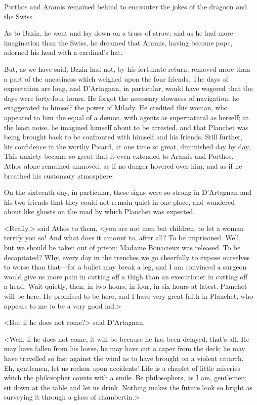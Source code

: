 Porthos and Aramis remained behind to encounter the jokes of the dragoon and the Swiss. 

As to Bazin, he went and lay down on a truss of straw; and as he had more imagination than the Swiss, he dreamed that Aramis, having become pope, adorned his head with a cardinal's hat. 

But, as we have said, Bazin had not, by his fortunate return, removed more than a part of the uneasiness which weighed upon the four friends. The days of expectation are long, and D'Artagnan, in particular, would have wagered that the days were forty-four hours. He forgot the necessary slowness of navigation; he exaggerated to himself the power of Milady. He credited this woman, who appeared to him the equal of a demon, with agents as supernatural as herself; at the least noise, he imagined himself about to be arrested, and that Planchet was being brought back to be confronted with himself and his friends. Still further, his confidence in the worthy Picard, at one time so great, diminished day by day. This anxiety became so great that it even extended to Aramis and Porthos. Athos alone remained unmoved, as if no danger hovered over him, and as if he breathed his customary atmosphere. 

On the sixteenth day, in particular, these signs were so strong in D'Artagnan and his two friends that they could not remain quiet in one place, and wandered about like ghosts on the road by which Planchet was expected. 

<Really,> said Athos to them, <you are not men but children, to let a woman terrify you so! And what does it amount to, after all? To be imprisoned. Well, but we should be taken out of prison; Madame Bonacieux was released. To be decapitated? Why, every day in the trenches we go cheerfully to expose ourselves to worse than that—for a bullet may break a leg, and I am convinced a surgeon would give us more pain in cutting off a thigh than an executioner in cutting off a head. Wait quietly, then; in two hours, in four, in six hours at latest, Planchet will be here. He promised to be here, and I have very great faith in Planchet, who appears to me to be a very good lad.> 

<But if he does not come?> said D'Artagnan. 

<Well, if he does not come, it will be because he has been delayed, that's all. He may have fallen from his horse, he may have cut a caper from the deck; he may have travelled so fast against the wind as to have brought on a violent catarrh. Eh, gentlemen, let us reckon upon accidents! Life is a chaplet of little miseries which the philosopher counts with a smile. Be philosophers, as I am, gentlemen; sit down at the table and let us drink. Nothing makes the future look so bright as surveying it through a glass of chambertin.> 

